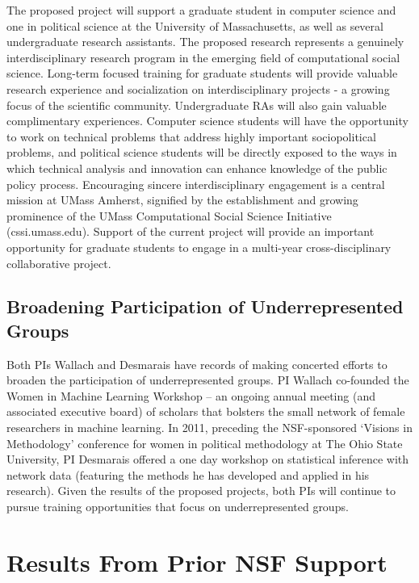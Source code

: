 The proposed project will support a graduate student in computer science and one in political science at the University of Massachusetts, as well as several undergraduate research assistants.  The proposed research represents a genuinely interdisciplinary research program in the emerging field of computational social science. Long-term focused training for graduate students will provide valuable research experience and socialization on interdisciplinary projects - a growing focus of the scientific community. Undergraduate RAs will also gain valuable complimentary experiences. Computer science students will have the opportunity to work on technical problems that address highly important sociopolitical problems, and political science students will be directly exposed to the ways in which technical analysis and innovation can enhance knowledge of the public policy process. Encouraging sincere interdisciplinary engagement is a central mission at UMass Amherst, signified by the establishment and growing prominence of the UMass Computational Social Science Initiative (cssi.umass.edu). Support of the current project will provide an important opportunity for graduate students to engage in a multi-year cross-disciplinary collaborative project.

\subsection{Broadening Participation of Underrepresented Groups}

Both PIs Wallach and Desmarais have records of making concerted
efforts to broaden the participation of underrepresented groups. PI
Wallach co-founded the Women in Machine Learning Workshop -- an
ongoing annual meeting (and associated executive board) of scholars
that bolsters the small network of female researchers in machine
learning. In 2011, preceding the NSF-sponsored `Visions in
Methodology' conference for women in political methodology at The Ohio
State University, PI Desmarais offered a one day workshop on
statistical inference with network data (featuring the methods he has
developed and applied in his research). Given the results of the
proposed projects, both PIs will continue to pursue training
opportunities that focus on underrepresented groups.



\section{Results From Prior NSF Support}

